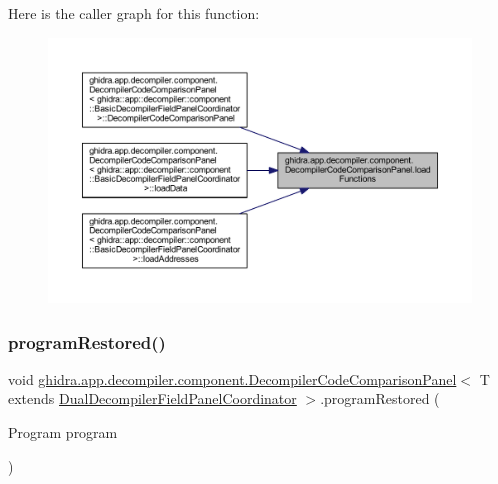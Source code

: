 Here is the caller graph for this function\+:
\nopagebreak
\begin{figure}[H]
\begin{center}
\leavevmode
\includegraphics[width=350pt]{classghidra_1_1app_1_1decompiler_1_1component_1_1_decompiler_code_comparison_panel_ae9896a0f54a402d26175af3cff5ada29_icgraph}
\end{center}
\end{figure}
\mbox{\label{classghidra_1_1app_1_1decompiler_1_1component_1_1_decompiler_code_comparison_panel_a0744d650c2f9a7496912c02b818251b7}} 
\subsubsection{\texorpdfstring{programRestored()}{programRestored()}}
{\footnotesize\ttfamily void \mbox{\hyperlink{classghidra_1_1app_1_1decompiler_1_1component_1_1_decompiler_code_comparison_panel}{ghidra.\+app.\+decompiler.\+component.\+Decompiler\+Code\+Comparison\+Panel}}$<$ T extends \mbox{\hyperlink{classghidra_1_1app_1_1decompiler_1_1component_1_1_dual_decompiler_field_panel_coordinator}{Dual\+Decompiler\+Field\+Panel\+Coordinator}} $>$.program\+Restored (\begin{DoxyParamCaption}\item[{Program}]{program }\end{DoxyParamCaption})\hspace{0.3cm}{\ttfamily [inline]}}



